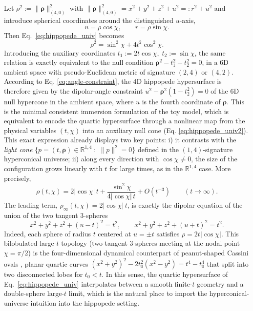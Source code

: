 \documentclass[preprint,12pt]{elsarticle}
\renewcommand{\vec}[1]{\boldsymbol{#1}}
\begin{document}
 Let $\rho^2 := \|\vec \rho\|_{\scriptscriptstyle{(4,0)}}^2$ with $\|\vec \rho\|_{\scriptscriptstyle{(4,0)}}^2=x^2 + y^2+z^2 + u^2 =: r^2 + u^2$ and introduce spherical coordinates around the distinguished $u$-axis,
\begin{equation}\label{eq:angle-constraint}
u=\rho\cos\chi,\qquad r=\rho\sin\chi.
\end{equation}
Then Eq.~\eqref{eq:hippopede_univ} becomes
\begin{equation}
\label{eq:hippopede_univ2}
\rho^2=\sin^2\chi+4t^2\cos^2\chi.
\end{equation}
Introducing the auxiliary coordinates
$t_1:=2t\cos\chi,\; t_2:=\sin\chi$,
the same relation is exactly equivalent to the null condition $\vec{\rho}^2-t_1^2-t_2^2=0$,
in a 6D ambient space with pseudo-Euclidean metric of signature $(2,4)$ or $(4,2)$. According to Eq. \ref{eq:angle-constraint}, the 4D hippopede hypersurface is therefore given by the dipolar-angle constraint $u^2-{\vec \rho}^2(1-t_2^2) = 0$ of the 6D null hypercone in the ambient space, where $u$ is the fourth coordinate of $\vec \rho$. This is the minimal consistent immersion formulation of the toy model, which is equivalent to encode the quartic hypersurface through a nonlinear map from the physical variables $(t,\chi)$ into an auxiliary null cone (Eq. \ref{eq:hippopede_univ2}). This exact expression already displays two key points: i) it contrasts with the \textit{light cone} $\{p = (t,\vec{\rho}) \in \mathbb{R}^{1,4}\;:\; \|p\|^2 = 0\}$ defined in the $(1,4)$-signature hyperconical universe; ii) along every direction with $\cos\chi\neq0$, the size of the configuration grows linearly with $t$ for large times, as in the $\mathbb{R}^{1,4}$ case. More precisely,
\begin{equation}
\rho(t,\chi)=2|{\cos\chi}|\,t+\frac{\sin^2\chi}{4|{\cos\chi}|\,t}+O(t^{-3})\qquad (t\to\infty).
\end{equation}
The leading term, $\rho_{\infty}(t,\chi)=2|{\cos\chi}|\,t$, is exactly the dipolar equation of the union of the two tangent $3$-spheres
\begin{equation}
x^2+y^2+z^2+(u-t)^2=t^2,\qquad x^2+y^2+z^2+(u+t)^2=t^2.
\end{equation}
Indeed, each sphere of radius $t$ centered at $u=\pm t$ satisfies $\rho=2t|\cos\chi|$. This bilobulated large-$t$ topology (two tangent 3-spheres meeting at the nodal point $\chi=\pi/2$) is the four-dimensional dynamical counterpart of peanut-shaped Cassini ovals \cite{das2025peanut,lawrence1972catalogue}, planar quartic curves $(x^2+y^2)^2-2t_0^2(x^2-y^2)=t^4-t_0^4$ that split into two disconnected lobes for $t_0 < t$. In this sense, the quartic hypersurface of Eq.~\eqref{eq:hippopede_univ} interpolates between a smooth finite-$t$ geometry and a double-sphere large-$t$ limit, which is the natural place to import the hyperconical-universe intuition into the hippopede setting.
\end{document}
